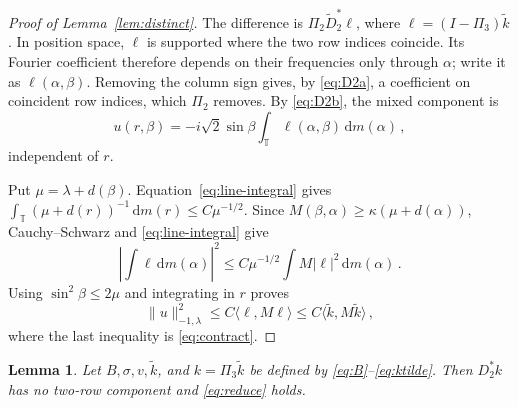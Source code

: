 \documentclass[11pt]{amsart}
\theoremstyle{plain}
\newtheorem{lemma}[theorem]{Lemma}
\theoremstyle{definition}
\newcommand{\T}{\mathbb T}
\newcommand{\1}{\mathbf 1}
\newcommand{\ip}[2]{\langle #1,#2\rangle}
\newcommand{\norm}[1]{\lVert #1\rVert}
\newcommand{\abs}[1]{\lvert #1\rvert}
\newcommand{\dd}{\,\mathrm d}
\newcommand{\Hminus}[1]{\norm{#1}_{-1,\lambda}}
\begin{document}
\begin{proof}[Proof of Lemma~\ref{lem:distinct}]
The difference is $\Pi_2\widetilde D_2^*\ell$, where
$\ell=(I-\Pi_3)\widetilde k$.  In position space, $\ell$ is supported where
the two row indices coincide.  Its Fourier coefficient therefore depends on
their frequencies only through $\alpha$; write it as
$\ell(\alpha,\beta)$.  Removing the column sign gives, by
\eqref{eq:D2a}, a coefficient on coincident row indices, which $\Pi_2$
removes.  By \eqref{eq:D2b}, the mixed component is
\[
  u(r,\beta)=-i\sqrt2\sin\beta
  \int_\T\ell(\alpha,\beta)\dd m(\alpha)\, ,
\]
independent of $r$.

Put $\mu=\lambda+d(\beta)$.  Equation~\eqref{eq:line-integral} gives
$\int_\T(\mu+d(r))^{-1}\dd m(r)\leq C\mu^{-1/2}$.  Since
$M(\beta,\alpha)\geq \kappa(\mu+d(\alpha))$, Cauchy--Schwarz and
\eqref{eq:line-integral}
give
\[
  \left|\int\ell\dd m(\alpha)\right|^2
  \leq C\mu^{-1/2}\int M\abs\ell^2\dd m(\alpha)\, .
\]
Using $\sin^2\beta\leq2\mu$ and integrating in $r$ proves
\[
  \Hminus u^2\leq C\ip\ell{M\ell}
  \leq C\ip{\widetilde k}{M\widetilde k}\, ,
\]
where the last inequality is \eqref{eq:contract}.
\end{proof}

\begin{lemma}\label{lem:correction-calculation}
Let $B,\sigma,v,\widetilde k$, and $k=\Pi_3\widetilde k$ be defined by
\eqref{eq:B}--\eqref{eq:ktilde}.  Then $D_2^*k$ has no two-row component and
\eqref{eq:reduce} holds.
\end{lemma}
\end{document}

